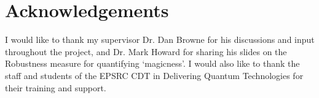 \documentclass{standalone}
\begin{document}
\section*{Acknowledgements}
I would like to thank my supervisor Dr. Dan Browne for his discussions and input throughout the project, and Dr. Mark Howard for sharing his slides on the Robustness measure for quantifying `magicness'. I would also like to thank the staff and students of the EPSRC CDT in Delivering Quantum Technologies for their training and support. 

\ifstandalone 

\fi
\end{document}

